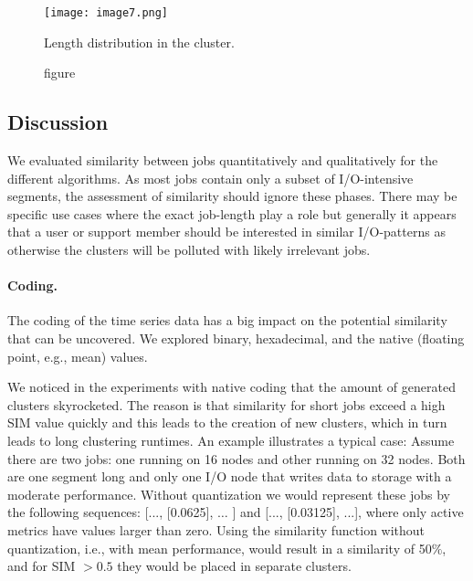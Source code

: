 \documentclass{jhps}
\begin{document}
\begin{minipage}{\textwidth}
\medskip

\begingroup
  \begin{subfigure}{\textwidth}
  \centering
  \texttt{[image: image7.png]}
  \caption{figure}{Length distribution in the cluster.}
  \label{fig:use_case:pm_quant:length}
  \end{subfigure}
\endgroup

\label{fig:use_case:pm_quant}
\end{minipage}



\subsection{Discussion}
We evaluated similarity between jobs quantitatively and qualitatively for the different algorithms.
As most jobs contain only a subset of I/O-intensive segments, the assessment of similarity should ignore these phases.
There may be specific use cases where the exact job-length play a role but generally it appears that a user or support member should be interested in similar I/O-patterns as otherwise the clusters will be polluted with likely irrelevant jobs.


\paragraph{Coding.} The coding of the time series data has a big impact on the potential similarity that can be uncovered.
We explored binary, hexadecimal, and the native (floating point, e.g., mean) values.

We noticed in the experiments with native coding that the amount of generated clusters skyrocketed.
The reason is that similarity for short jobs exceed a high SIM value quickly and this leads to the creation of new clusters, which in turn leads to long clustering runtimes.
An example illustrates a typical case:
Assume there are two jobs: one running on 16 nodes and other running on 32 nodes.
Both are one segment long and only one I/O node that writes data to storage with a moderate performance.
Without quantization we would represent these jobs by the following sequences:  [..., [0.0625], $ \ldots $ ] and [..., [0.03125], ...], where only active metrics have values larger than zero.
Using the similarity function without quantization, i.e., with mean performance, would result in a similarity of 50$\%$, and for SIM $>0.5$ they would be placed in separate clusters.
\end{document}
